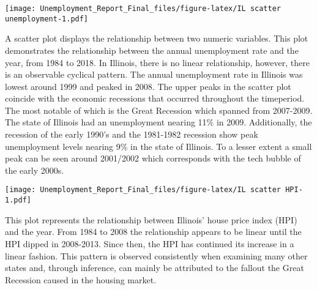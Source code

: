 \documentclass[
]{article}
\newenvironment{Shaded}{\begin{snugshade}}{\end{snugshade}}
\newcommand{\CharTok}[1]{\textcolor[rgb]{0.31,0.60,0.02}{#1}}
\newcommand{\DataTypeTok}[1]{\textcolor[rgb]{0.13,0.29,0.53}{#1}}
\newcommand{\DecValTok}[1]{\textcolor[rgb]{0.00,0.00,0.81}{#1}}
\newcommand{\KeywordTok}[1]{\textcolor[rgb]{0.13,0.29,0.53}{\textbf{#1}}}
\newcommand{\NormalTok}[1]{#1}
\newcommand{\OperatorTok}[1]{\textcolor[rgb]{0.81,0.36,0.00}{\textbf{#1}}}
\newcommand{\StringTok}[1]{\textcolor[rgb]{0.31,0.60,0.02}{#1}}
\begin{document}
\texttt{[image: Unemployment\_Report\_Final\_files/figure-latex/IL scatter unemployment-1.pdf]}

A scatter plot displays the relationship between two numeric variables.
This plot demonstrates the relationship between the annual unemployment
rate and the year, from 1984 to 2018. In Illinois, there is no linear
relationship, however, there is an observable cyclical pattern. The
annual unemployment rate in Illinois was lowest around 1999 and peaked
in 2008. The upper peaks in the scatter plot coincide with the economic
recessions that occurred throughout the timeperiod. The most notable of
which is the Great Recession which spanned from 2007-2009. The state of
Illinois had an unemployment nearing 11\% in 2009. Additionally, the
recession of the early 1990's and the 1981-1982 recession show peak
unemployment levels nearing 9\% in the state of Illinois. To a lesser
extent a small peak can be seen around 2001/2002 which corresponds with
the tech bubble of the early 2000s.

\begin{Shaded}
\end{Shaded}

\texttt{[image: Unemployment\_Report\_Final\_files/figure-latex/IL scatter HPI-1.pdf]}

This plot represents the relationship between Illinois' house price
index (HPI) and the year. From 1984 to 2008 the relationship appears to
be linear until the HPI dipped in 2008-2013. Since then, the HPI has
continued its increase in a linear fashion. This pattern is observed
consistently when examining many other states and, through inference,
can mainly be attributed to the fallout the Great Recession caused in
the housing market.

\begin{Shaded}
\end{Shaded}
\end{document}

